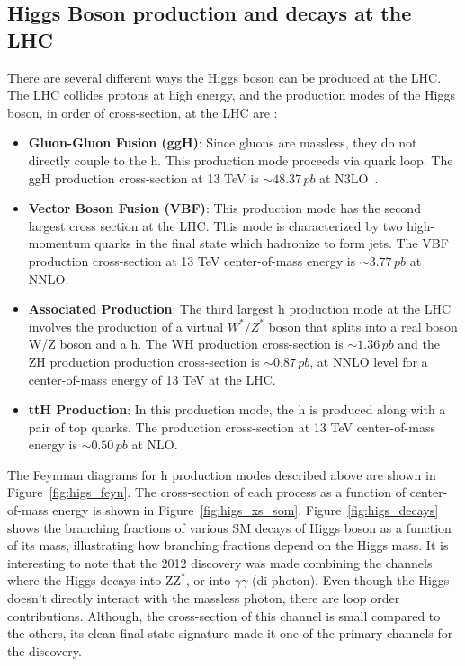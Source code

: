\subsection{Higgs Boson production and decays at the LHC}
There are several different ways the Higgs boson can be produced at the LHC. The LHC collides protons at high energy, and the production modes of the Higgs boson, in order of cross-section, at the LHC are :

\begin{itemize}%
\item \textbf{Gluon-Gluon Fusion (ggH)}: Since gluons are massless, they do not directly couple to the h. This production mode proceeds via quark loop. The ggH production cross-section at 13 TeV is $\sim48.37\,pb$ at N3LO~\cite{YR4}. 
\item \textbf {Vector Boson Fusion (VBF)}: This production mode has the second largest cross section at the LHC. This mode is characterized by two high-momentum quarks in the final state which hadronize to form jets. The VBF production cross-section at 13 TeV center-of-mass energy is $\sim3.77\,pb$ at NNLO.
\item \textbf {Associated Production}: The third largest h production mode at the LHC involves the production of a virtual $W^*/Z^*$ boson that splits into a real boson W/Z boson and a h. The WH production cross-section is  $\sim1.36\,pb$ and the ZH production production cross-section is $\sim0.87\,pb$, at NNLO level for a center-of-mass energy of 13 TeV at the LHC.
\item \textbf {ttH Production}:   In this production mode, the h is produced along with a pair of top quarks. The production cross-section at 13 TeV center-of-mass energy is $\sim0.50\,pb$ at NLO.
\end{itemize}
  
The Feynman diagrams for h production modes described above are shown in Figure~\ref{fig:higs_feyn}. The cross-section of each process as a function of center-of-mass energy is shown in Figure~\ref{fig:higs_xs_som}. Figure~\ref{fig:higs_decays} shows the branching fractions of various SM decays of Higgs boson as a function of its mass, illustrating how branching fractions depend on the Higgs mass. It is interesting to note that the 2012 discovery was made combining the channels where the Higgs decays into Z$\mathrm{Z}^*$, or into $\gamma\gamma$ (di-photon). Even though the Higgs doesn't directly interact with the massless photon, there are loop order contributions. Although, the cross-section of this channel is small compared to the others, its clean final state signature made it one of the primary channels for the discovery.    


